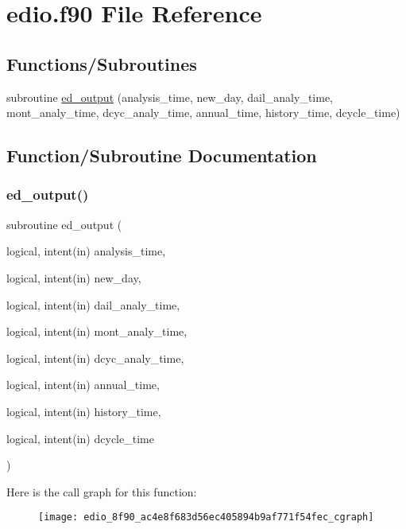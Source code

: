 \hypertarget{edio_8f90}{}\section{edio.\+f90 File Reference}
\label{edio_8f90}
\subsection*{Functions/\+Subroutines}
\begin{DoxyCompactItemize}
\item 
subroutine \hyperlink{edio_8f90_ac4e8f683d56ec405894b9af771f54fec}{ed\+\_\+output} (analysis\+\_\+time, new\+\_\+day, dail\+\_\+analy\+\_\+time, mont\+\_\+analy\+\_\+time, dcyc\+\_\+analy\+\_\+time, annual\+\_\+time, history\+\_\+time, dcycle\+\_\+time)
\end{DoxyCompactItemize}


\subsection{Function/\+Subroutine Documentation}
\mbox{\label{edio_8f90_ac4e8f683d56ec405894b9af771f54fec}} 
\subsubsection{\texorpdfstring{ed\+\_\+output()}{ed\_output()}}
{\footnotesize\ttfamily subroutine ed\+\_\+output (\begin{DoxyParamCaption}\item[{logical, intent(in)}]{analysis\+\_\+time,  }\item[{logical, intent(in)}]{new\+\_\+day,  }\item[{logical, intent(in)}]{dail\+\_\+analy\+\_\+time,  }\item[{logical, intent(in)}]{mont\+\_\+analy\+\_\+time,  }\item[{logical, intent(in)}]{dcyc\+\_\+analy\+\_\+time,  }\item[{logical, intent(in)}]{annual\+\_\+time,  }\item[{logical, intent(in)}]{history\+\_\+time,  }\item[{logical, intent(in)}]{dcycle\+\_\+time }\end{DoxyParamCaption})}

Here is the call graph for this function\+:
\nopagebreak
\begin{figure}[H]
\begin{center}
\leavevmode
\texttt{[image: edio\_8f90\_ac4e8f683d56ec405894b9af771f54fec\_cgraph]}
\end{center}
\end{figure}
